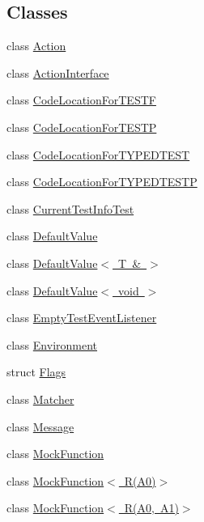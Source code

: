 \subsection*{Classes}
\begin{DoxyCompactItemize}
\item 
class \mbox{\hyperlink{classtesting_1_1Action}{Action}}
\item 
class \mbox{\hyperlink{classtesting_1_1ActionInterface}{Action\+Interface}}
\item 
class \mbox{\hyperlink{classtesting_1_1CodeLocationForTESTF}{Code\+Location\+For\+T\+E\+S\+TF}}
\item 
class \mbox{\hyperlink{classtesting_1_1CodeLocationForTESTP}{Code\+Location\+For\+T\+E\+S\+TP}}
\item 
class \mbox{\hyperlink{classtesting_1_1CodeLocationForTYPEDTEST}{Code\+Location\+For\+T\+Y\+P\+E\+D\+T\+E\+ST}}
\item 
class \mbox{\hyperlink{classtesting_1_1CodeLocationForTYPEDTESTP}{Code\+Location\+For\+T\+Y\+P\+E\+D\+T\+E\+S\+TP}}
\item 
class \mbox{\hyperlink{classtesting_1_1CurrentTestInfoTest}{Current\+Test\+Info\+Test}}
\item 
class \mbox{\hyperlink{classtesting_1_1DefaultValue}{Default\+Value}}
\item 
class \mbox{\hyperlink{classtesting_1_1DefaultValue_3_01T_01_6_01_4}{Default\+Value$<$ T \& $>$}}
\item 
class \mbox{\hyperlink{classtesting_1_1DefaultValue_3_01void_01_4}{Default\+Value$<$ void $>$}}
\item 
class \mbox{\hyperlink{classtesting_1_1EmptyTestEventListener}{Empty\+Test\+Event\+Listener}}
\item 
class \mbox{\hyperlink{classtesting_1_1Environment}{Environment}}
\item 
struct \mbox{\hyperlink{structtesting_1_1Flags}{Flags}}
\item 
class \mbox{\hyperlink{classtesting_1_1Matcher}{Matcher}}
\item 
class \mbox{\hyperlink{classtesting_1_1Message}{Message}}
\item 
class \mbox{\hyperlink{classtesting_1_1MockFunction}{Mock\+Function}}
\item 
class \mbox{\hyperlink{classtesting_1_1MockFunction_3_01R_07A0_08_4}{Mock\+Function$<$ R(\+A0)$>$}}
\item 
class \mbox{\hyperlink{classtesting_1_1MockFunction_3_01R_07A0_00_01A1_08_4}{Mock\+Function$<$ R(\+A0, A1)$>$}}

\end{DoxyCompactItemize}
